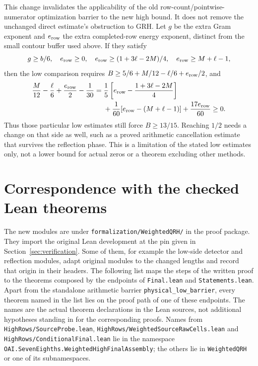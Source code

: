\documentclass[11pt]{article}
\begin{document}
This change invalidates the applicability of the old
row-count/pointwise-numerator optimization barrier to the new high bound. It does not remove
the unchanged direct estimate's obstruction to GRH. Let $g$ be the
extra Gram exponent and $e_{\rm row}$ the extra completed-row energy
exponent, distinct from the small contour buffer used above. If they
satisfy
\[
 g\ge b/6,\quad e_{\rm row}\ge0,\quad
 e_{\rm row}\ge(1+3\ell-2M)/4,\quad e_{\rm row}\ge M+\ell-1,
\]
then the low comparison requires
$B\ge5/6+M/12-\ell/6+e_{\rm row}/2$, and
\begin{align*}
 \frac M{12}-\frac\ell6+\frac{e_{\rm row}}2-\frac1{30}
 ={}&\frac15\left[e_{\rm row}-\frac{1+3\ell-2M}{4}\right]\\
 &+\frac1{60}[e_{\rm row}-(M+\ell-1)]
       +\frac{17e_{\rm row}}{60}\ge0.
\end{align*}
Thus those particular low estimates still force $B\ge13/15$.
Reaching $1/2$ needs a change on that side as well, such as a proved
arithmetic cancellation estimate that survives the reflection phase.
This is a limitation of the stated low estimates only, not a lower bound
for actual zeros or a theorem excluding other methods.

\section{Correspondence with the checked Lean theorems}
\label{sec:lean-correspondence}

\begingroup
\raggedright
The new modules are under \nolinkurl{formalization/WeightedQRH/} in the
proof package. They import the original Lean development \cite{fork} at
the pin given in Section~\ref{sec:verification}. Some of them, for
example the low-side detector and reflection modules, adapt original
modules to the changed lengths and record that origin in their headers.
The following list maps the steps of the written proof to the theorems
composed by the endpoints of \nolinkurl{Final.lean} and
\nolinkurl{Statements.lean}. Apart from the standalone arithmetic barrier
\nolinkurl{physical_low_barrier}, every theorem named in the list lies on
the proof path of one of these endpoints. The names are the actual
theorem declarations in the Lean sources, not additional hypotheses
standing in for the corresponding proofs. Names
from \nolinkurl{HighRows/SourceProbe.lean},
\nolinkurl{HighRows/WeightedSourceRawCells.lean} and
\nolinkurl{HighRows/ConditionalFinal.lean} lie in the namespace
\nolinkurl{OAI.SevenEighths.WeightedHighFinalAssembly}; the others lie in
\nolinkurl{WeightedQRH} or one of its subnamespaces.
\end{document}
